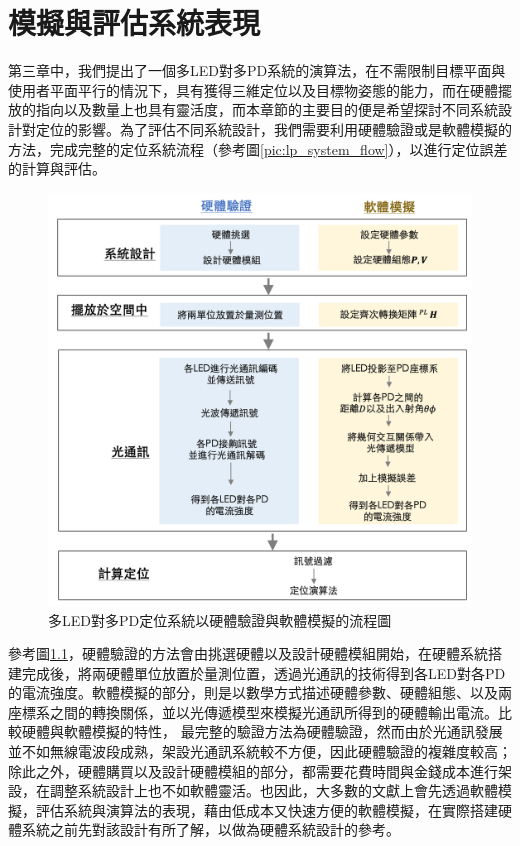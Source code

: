\chapter{模擬與評估系統表現}
\label{chp:4}


第三章中，我們提出了一個多LED對多PD系統的演算法，在不需限制目標平面與使用者平面平行的情況下，具有獲得三維定位以及目標物姿態的能力，而在硬體擺放的指向以及數量上也具有靈活度，而本章節的主要目的便是希望探討不同系統設計對定位的影響。為了評估不同系統設計，我們需要利用硬體驗證或是軟體模擬的方法，完成完整的定位系統流程（參考圖\ref{pic:lp_system_flow}），以進行定位誤差的計算與評估。

\begin{figure}[ht]
    \centering
    \includegraphics[width=15cm]{ch4pic/simulate_hardware.png}
    \caption{多LED對多PD定位系統以硬體驗證與軟體模擬的流程圖}
    \label{pic:simulate_hardware}
\end{figure}

參考圖\ref{pic:simulate_hardware}，硬體驗證的方法會由挑選硬體以及設計硬體模組開始，在硬體系統搭建完成後，將兩硬體單位放置於量測位置，透過光通訊的技術得到各LED對各PD的電流強度。軟體模擬的部分，則是以數學方式描述硬體參數、硬體組態、以及兩座標系之間的轉換關係，並以光傳遞模型來模擬光通訊所得到的硬體輸出電流。比較硬體與軟體模擬的特性， 最完整的驗證方法為硬體驗證，然而由於光通訊發展並不如無線電波段成熟，架設光通訊系統較不方便，因此硬體驗證的複雜度較高；除此之外，硬體購買以及設計硬體模組的部分，都需要花費時間與金錢成本進行架設，在調整系統設計上也不如軟體靈活。也因此，大多數的文獻上會先透過軟體模擬，評估系統與演算法的表現，藉由低成本又快速方便的軟體模擬，在實際搭建硬體系統之前先對該設計有所了解，以做為硬體系統設計的參考。

